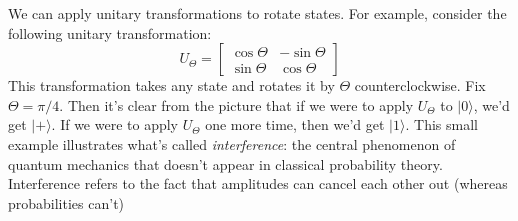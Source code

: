 \documentclass[11pt]{report}
\theoremstyle{plain}
\theoremstyle{definition}
\renewcommand{\ket}[1]{|#1\rangle}
\begin{document}
We can apply unitary transformations to rotate states. For example, consider the following unitary transformation:
\[
U_\Theta =
\begin{bmatrix}
\cos \Theta & - \sin \Theta \\
\sin \Theta & \cos \Theta
\end{bmatrix}
\]
This transformation takes any state and rotates it by $\Theta$ counterclockwise. Fix $\Theta = \pi/4$. Then it's clear from the picture that if we were to apply $U_\Theta$ to $\ket{0}$, we'd get $\ket{+}$. If we were to apply $U_\Theta$ one more time, then we'd get $\ket{1}$. This small example illustrates what's called \emph{interference}: the central phenomenon of quantum mechanics that doesn't appear in classical probability theory.  Interference refers to the fact that amplitudes can cancel each other out (whereas probabilities can't)
\end{document}
